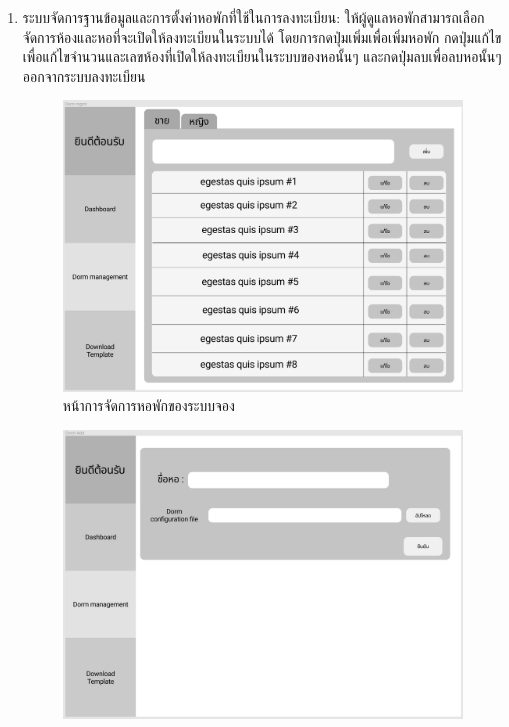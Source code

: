 \begin{enumerate}
  \clearpage
  \item ระบบจัดการฐานข้อมูลและการตั้งค่าหอพักที่ใช้ในการลงทะเบียน: ให้ผู้ดูแลหอพักสามารถเลือกจัดการห้องและหอที่จะเปิดให้ลงทะเบียนในระบบได้
      โดยการกดปุ่มเพิ่มเพื่อเพิ่มหอพัก กดปุ่มแก้ไขเพื่อแก้ไขจำนวนและเลขห้องที่เปิดให้ลงทะเบียนในระบบของหอนั้นๆ และกดปุ่มลบเพื่อลบหอนั้นๆออกจากระบบลงทะเบียน
  \begin{figure}[h]
  \begin{center}
  \includegraphics[width=\linewidth]{photo/dormmgmt.png}
  \end{center}
  \caption{หน้าการจัดการหอพักของระบบจอง}
  \label{fig:mgmt}
  \end{figure}
  \begin{figure}[h]
  \begin{center}
  \includegraphics[width=\linewidth]{photo/dormadd.png}

\end{center}
\end{figure}
\end{enumerate}

